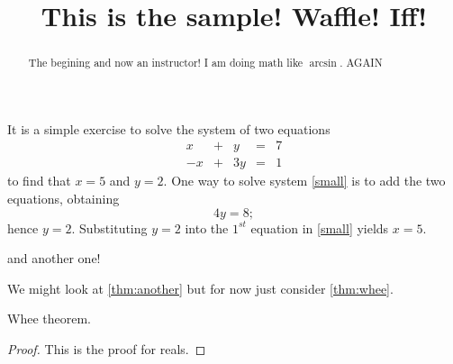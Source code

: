 \documentclass{ximera}
\title[Breal-grond]{This is the sample! Waffle!  Iff!}
\begin{document}
\begin{abstract}
  The begining and now an instructor! I am doing math like $\arcsin$. AGAIN
\end{abstract}

\maketitle

\mypreamble

It is a simple exercise to solve the system of two equations
\begin{equation} \label{small}
\begin{array}{rcrcr}
 x & + & y & = & 7 \\
-x & + & 3y & = & 1
\end{array}
\end{equation}
to find that $x=5$ and $y=2$.  One way to solve
system \ref{small} is to add the two equations, obtaining
\[
4y=8;
\]
hence $y=2$.  Substituting $y=2$ into the $1^{st}$ equation in
\ref{small} yields $x=5$.





and another one!



We might look at \ref{thm:another} but for now just consider \ref{thm:whee}.

\begin{theorem}
  \label{thm:whee}  Whee theorem.
\end{theorem}
\begin{proof}
This is the proof for reals.
\end{proof}
\end{document}
